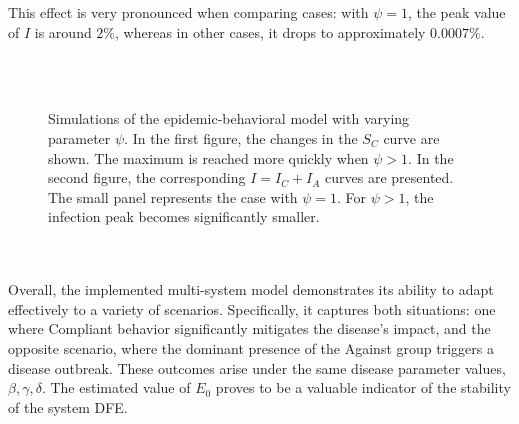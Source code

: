 This effect is very pronounced when comparing cases: with $\psi = 1$, the peak value of $I$ is around $2\%$, whereas in other cases, it drops to approximately $0.0007\%$.
\begin{figure}[ht]
	\centering
	 \\
	 \\
	\caption[Simulation varying $\psi$]{Simulations of the epidemic-behavioral model with varying parameter $\psi$. In the first figure, the changes in the $S_C$ curve are shown. The maximum is reached more quickly when $\psi > 1$. In the second figure, the corresponding $I = I_C + I_A$ curves are presented. The small panel represents the case with $\psi = 1$. For $\psi > 1$, the infection peak becomes significantly smaller.}
	\label{fig:sim_psi}
\end{figure}
\\
\\
Overall, the implemented multi-system model demonstrates its ability to adapt effectively to a variety of scenarios. Specifically, it captures both situations: one where Compliant behavior significantly mitigates the disease's impact, and the opposite scenario, where the dominant presence of the Against group triggers a disease outbreak. These outcomes arise under the same disease parameter values, $\beta, \gamma, \delta$. The estimated value of $E_0$ proves to be a valuable indicator of the stability of the system DFE. 
